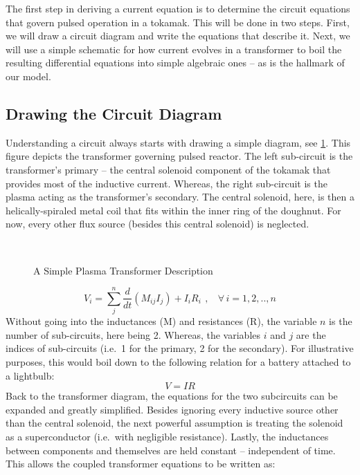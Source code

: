 The first step in deriving a current equation is to determine the circuit equations that govern pulsed operation in a tokamak. This will be done in two steps. First, we will draw a circuit diagram and write the equations that describe it. Next, we will use a simple schematic for how current evolves in a transformer to boil the resulting differential equations into simple algebraic ones -- as is the hallmark of our model.

\subsection{Drawing the Circuit Diagram}

Understanding a circuit always starts with drawing a simple diagram, see \cref{fig:circuit_diagram}. This figure depicts the transformer governing pulsed reactor. The left sub-circuit is the transformer's primary -- the central solenoid component of the tokamak that provides most of the inductive current. Whereas, the right sub-circuit is the plasma acting as the transformer's secondary. The central solenoid, here, is then a helically-spiraled metal coil that fits within the inner ring of the doughnut. For now, every other flux source (besides this central solenoid) is neglected.

\begin{figure}[]
\centering

\caption{A Simple Plasma Transformer Description} ~\\
\label{fig:circuit_diagram}
\end{figure}

\begin{equation}
	V_i = \sum_j^n \frac{d}{dt} \left( M_{ij} I_j \right) + I_i R_i \ \, , \ \ \ \ \forall \, i = 1,2,..,n
\end{equation}
Without going into the inductances (M) and resistances (R), the variable $n$ is the number of sub-circuits, here being 2. Whereas, the variables $i$ and $j$ are the indices of sub-circuits (i.e.\ 1 for the primary, 2 for the secondary). For illustrative purposes, this would boil down to the following relation for a battery attached to a lightbulb:
\begin{equation}
	V = I R
\end{equation}
Back to the transformer diagram, the equations for the two subcircuits can be expanded and greatly simplified. Besides ignoring every inductive source other than the central solenoid, the next powerful assumption is treating the solenoid as a superconductor (i.e.\ with negligible resistance). Lastly, the inductances between components and themselves are held constant -- independent of time. This allows the coupled transformer equations to be written as:

